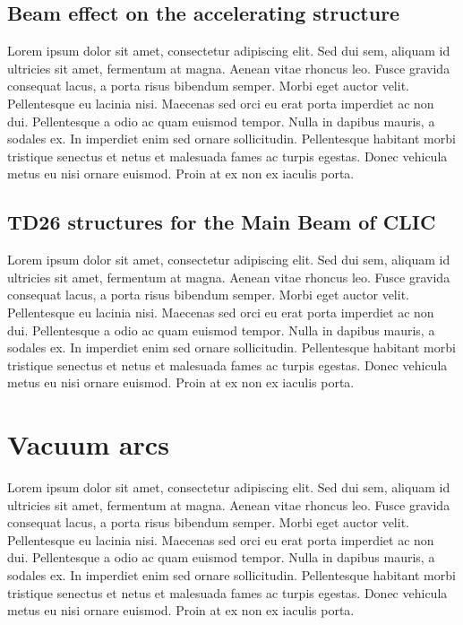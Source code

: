 \subsection[Beam effect on the accelerating structure]{Beam effect on the accelerating structure}
Lorem ipsum dolor sit amet, consectetur adipiscing elit. Sed dui sem, aliquam id ultricies sit amet, fermentum at magna. Aenean vitae rhoncus leo. Fusce gravida consequat lacus, a porta risus bibendum semper. Morbi eget auctor velit. Pellentesque eu lacinia nisi. Maecenas sed orci eu erat porta imperdiet ac non dui. Pellentesque a odio ac quam euismod tempor. Nulla in dapibus mauris, a sodales ex. In imperdiet enim sed ornare sollicitudin. Pellentesque habitant morbi tristique senectus et netus et malesuada fames ac turpis egestas. Donec vehicula metus eu nisi ornare euismod. Proin at ex non ex iaculis porta.



\subsection[TD26 structures for the Main Beam of CLIC]{TD26 structures for the Main Beam of CLIC}
Lorem ipsum dolor sit amet, consectetur adipiscing elit. Sed dui sem, aliquam id ultricies sit amet, fermentum at magna. Aenean vitae rhoncus leo. Fusce gravida consequat lacus, a porta risus bibendum semper. Morbi eget auctor velit. Pellentesque eu lacinia nisi. Maecenas sed orci eu erat porta imperdiet ac non dui. Pellentesque a odio ac quam euismod tempor. Nulla in dapibus mauris, a sodales ex. In imperdiet enim sed ornare sollicitudin. Pellentesque habitant morbi tristique senectus et netus et malesuada fames ac turpis egestas. Donec vehicula metus eu nisi ornare euismod. Proin at ex non ex iaculis porta.



\section[Vacuum arcs]{Vacuum arcs}
Lorem ipsum dolor sit amet, consectetur adipiscing elit. Sed dui sem, aliquam id ultricies sit amet, fermentum at magna. Aenean vitae rhoncus leo. Fusce gravida consequat lacus, a porta risus bibendum semper. Morbi eget auctor velit. Pellentesque eu lacinia nisi. Maecenas sed orci eu erat porta imperdiet ac non dui. Pellentesque a odio ac quam euismod tempor. Nulla in dapibus mauris, a sodales ex. In imperdiet enim sed ornare sollicitudin. Pellentesque habitant morbi tristique senectus et netus et malesuada fames ac turpis egestas. Donec vehicula metus eu nisi ornare euismod. Proin at ex non ex iaculis porta.

